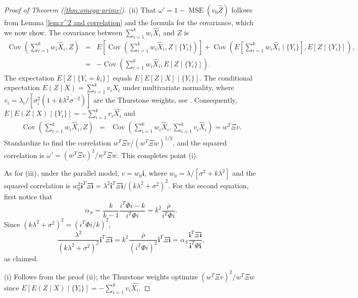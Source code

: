\documentclass[twoside]{article}
\DeclareMathOperator{\Cov}{Cov}
\DeclareMathOperator{\MSE}{MSE}
\DeclareMathOperator{\tsum}{\textstyle \sum}
\renewcommand{\sqrt}[1]{{(#1)^{1/2}}}
\begin{document}
\begin{proof}[Proof of Theorem (\ref{thm:omega-prime})]
\label{proof:omega-prime}(ii) That $\omega'=1-\MSE(v_{0}\hat{Z})$
follows from Lemma \ref{lem:r^2 and correlation} and the formula
for the covariance, which we now show. The covariance between $\tsum_{i=1}^{k}w_{i}\hat{X}_{i}$
and $Z$ is
\begin{eqnarray*}
\Cov(\tsum_{i=1}^{k}w_{i}\hat{X}_{i},Z) & = & E[\Cov(\tsum_{i=1}^{k}w_{i}\hat{X}_{i},Z\mid\{Y_{i}\})]+\Cov(E[\tsum_{i=1}^{k}w_{i}\hat{X}_{i}\mid\{Y_{i}\}],E[Z\mid\{Y_{i}\}]),\\
 & = & -\Cov(\tsum_{i=1}^{k}w_{i}\hat{X}_{i},E[Z\mid\{Y_{i}\}]).
\end{eqnarray*}
The expectation $E[Z\mid\{Y_{i}=k_{i}\}]$ equals $E[E[Z\mid X]\mid\{Y_{i}\}]$.
The conditional expectation $E(Z\mid X)=\tsum_{i=1}^{k}v_{i}X_{i}$
under multivariate normality, where $v_{i}=\lambda_{i}/[\sigma_{i}^{2}(1+k\overline{\lambda^{2}\sigma^{-2}})]$
are the Thurstone weights, see \citet[Theorem 3.3.4]{Tong1990-lm}.
Consequently, $E[E(Z\mid X)\mid\{Y_{i}\}]=-\tsum_{i=1}^{k}v_{i}\hat{X_{i}}$
and 
\begin{eqnarray*}
\Cov(\tsum_{i=1}^{k}w_{i}\hat{X}_{i},Z) & = & \Cov(\tsum_{i=1}^{k}w_{i}\hat{X}_{i},\tsum_{i=1}^{k}v_{i}\hat{X}_{i})=w^{T}\Xi v.
\end{eqnarray*}
Standardize to find the correlation $w^{T}\Xi v/\sqrt{w^{T}\Xi w}$,
and the squared correlation is $\omega'=(w^{T}\Xi v)^{2}/w^{T}\Xi w$.
This completes point (i). 

As for (iii), under the parallel model, $v=w_{0}\mathbf{i}$, where
$w_{0}=\lambda/[\sigma^{2}+k\lambda^{2}]$ and the squared correlation
is $w_{0}^{2}\mathbf{i}^{T}\Xi\mathbf{i}=\lambda^{2}\mathbf{i}^{T}\Xi\mathbf{i}/(k\lambda^{2}+\sigma^{2})^{2}$.
For the second equation, first notice that
\[
\alpha_S=\frac{k}{k-1}\frac{i^{T}\Phi i-k}{i^{T}\Phi i}=k^{2}\frac{\overline{\rho}}{i^{T}\Phi i}.
\]
Since $(k\lambda^{2}+\sigma^{2})^{2}=(i^{T}\Phi i/k)^{2}$, 
\begin{equation}
\frac{\lambda^{2}}{(k\lambda^{2}+\sigma^{2})^{2}}\mathbf{i}^{T}\Xi\mathbf{i} =  k^{2}\frac{\overline{\rho}}{(i^{T}\Phi i)^{2}}\mathbf{i}^{T}\Xi\mathbf{i} =  \alpha_S\frac{\mathbf{i}^{T}\Xi\mathbf{i}}{\mathbf{i}^{T}\Psi\mathbf{i}},\nonumber
\end{equation}
as claimed.

(i) Follows from the proof (ii); the Thurstone weights optimize $(w^{T}\Xi v)^{2}/w^{T}\Xi w$
since $E[E(Z\mid X)\mid\{Y_{i}\}]=-\tsum_{i=1}^{k}v_{i}\hat{X_{i}}$.
\end{proof}

%
%

\end{document}
